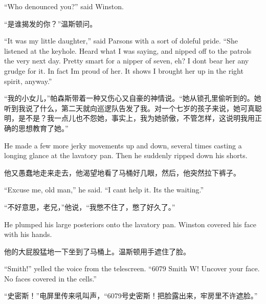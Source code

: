 \begin{paracol}{2}
\switchcolumn*

``Who denounced you?'' said Winston.

\switchcolumn

``是谁揭发的你？''温斯顿问。

\switchcolumn*

``It was my little daughter,'' said Parsons with a sort of doleful pride.
``She listened at the keyhole. Heard what I was saying, and nipped off to
the patrols the very next day. Pretty smart for a nipper of seven, eh? I
don\textquotesingle t bear her any grudge for it. In fact
I\textquotesingle m proud of her. It shows I brought her up in the right
spirit, anyway.''

\switchcolumn

``我的小女儿，''帕森斯带着一种又伤心又自豪的神情说。``她从锁孔里偷听到的。她听到我说了什么，第二天就向巡逻队告发了我。对一个七岁的孩子来说，她可真聪明，是不是？我一点儿也不怨她，事实上，我为她骄傲，不管怎样，这说明我用正确的思想教育了她。''

\switchcolumn*

He made a few more jerky movements up and down, several times casting a
longing glance at the lavatory pan. Then he suddenly ripped down his
shorts.

\switchcolumn

他又愚蠢地走来走去，他渴望地看了马桶好几眼，然后，他突然拉下裤子。

\switchcolumn*

``Excuse me, old man,'' he said. ``I can\textquotesingle t help it.
It\textquotesingle s the waiting.''

\switchcolumn

``不好意思，老兄，''他说，``我憋不住了，憋了好久了。''

\switchcolumn*

He plumped his large posteriors onto the lavatory pan. Winston covered
his face with his hands.

\switchcolumn

他的大屁股猛地一下坐到了马桶上。温斯顿用手遮住了脸。

\switchcolumn*

``Smith!'' yelled the voice from the telescreen. ``6079 Smith W! Uncover
your face. No faces covered in the cells.''

\switchcolumn

``史密斯！''电屏里传来吼叫声，``6079号史密斯！把脸露出来，牢房里不许遮脸。''

\switchcolumn*


\end{paracol}
